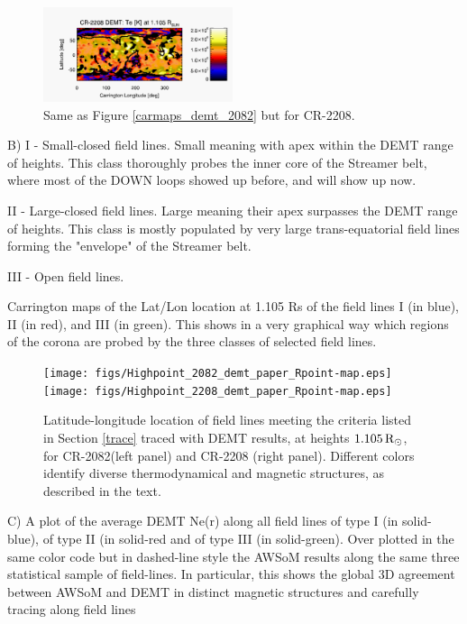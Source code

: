 \documentclass[namedreferences]{solarphysics}
\newcommand{\mrsun}{{\rm R_\odot}}
\begin{document}
\begin{article}
\begin{figure}
\begin{center}
\includegraphics[width=0.495\textwidth]{figs/map_Tm_CR2208_DEMT-AIA_H1_L522_r3d_1105_Rsun.pdf}
\caption{Same as Figure \ref{carmaps_demt_2082} but for CR-2208.}
\label{carmaps_demt_2208}
\end{center}
\end{figure}



B)    I - Small-closed field lines. Small meaning with apex within the DEMT range of heights. This class thoroughly probes the inner core of the Streamer belt, where most of the DOWN loops showed up before, and will show up now.

  II - Large-closed field lines. Large meaning their apex surpasses the DEMT range of heights. This class is mostly populated by very large trans-equatorial field lines forming the "envelope" of the Streamer belt.

 III - Open field lines.

Carrington maps of the Lat/Lon location at 1.105 Rs of the field lines I (in blue), II (in red), and III (in green). This shows in a very graphical way which regions of the corona are probed by the three classes of selected field lines. 

\begin{figure}%
\begin{center}
\texttt{[image: figs/Highpoint\_2082\_demt\_paper\_Rpoint-map.eps]}
\texttt{[image: figs/Highpoint\_2208\_demt\_paper\_Rpoint-map.eps]}
\caption{Latitude-longitude location of field lines meeting the criteria listed in Section \ref{trace} traced with DEMT results, at heights $1.105\,\mrsun$, for CR-2082(left panel) and CR-2208 (right panel). Different colors identify diverse thermodynamical and magnetic structures, as described in the text.}
\label{rpoint}
\end{center}
\end{figure} 



C) A plot of the average DEMT Ne(r) along all field lines of type I (in solid-blue), of type II (in solid-red and of type III (in solid-green). Over plotted in the same color code but in dashed-line style the AWSoM results along the same three statistical sample of field-lines. In particular, this shows the global 3D agreement between AWSoM and DEMT in distinct magnetic structures and carefully tracing along field lines 


\end{article}
\end{document}
